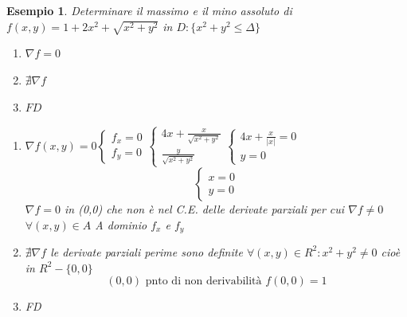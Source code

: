 \documentclass{book}
\newtheorem{esempio}{Esempio}
\newcommand{\abs}[1]{\lvert#1\rvert}
\begin{document}
\begin{esempio}
	Determinare il massimo e il mino assoluto di $f(x,y)=
	1+2x^2+\sqrt{x^2+y^2}$ in $D:\{x^2+y^2\leq \Delta\}$
	\begin{enumerate}
		\item $\nabla f=0$
		\item $\nexists \nabla f$
		\item $FD$
	\end{enumerate}
	\begin{enumerate}
		\item $\nabla f(x,y)=0\begin{cases}
				f_x=0\\
				f_y=0
		\end{cases}\begin{cases}
			4x+\frac{x}{\sqrt{x^2+y^2}}\\
			\frac{y}{\sqrt{x^2+y^2}}
		\end{cases}\begin{cases}
			4x+\frac{x}{\abs x}=0\\
			y=0
		\end{cases}$
		\begin{equation*}
			\begin{cases}
				x=0\\
				y=0
			\end{cases}
		\end{equation*}
			$\nabla f=0$ in (0,0) che non è nel C.E. delle derivate parziali
			per cui $\nabla f \neq 0$ $\forall (x,y)\in A$ A dominio $f_x$ e
			$f_y$
		\item $\nexists \nabla f$ le derivate parziali perime sono definite
			$\forall (x,y)\in R^2:x^2+y^2\neq 0$ cioè in $R^2-\{0,0\}$
			\begin{equation*}
				(0,0) \text{ pnto di non derivabilità } f(0,0)=1
			\end{equation*}
		\item FD 
	\end{enumerate}
\end{esempio}
\printindex
\end{document}

